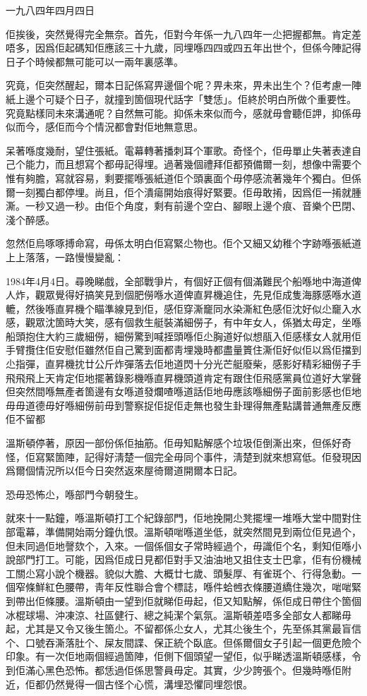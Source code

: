 一九八四年四月四日

佢挨後，突然覺得完全無奈。首先，佢對今年係一九八四年一尐把握都無。肯定差唔多，因爲佢起碼知佢應該三十九歲，同埋喺四四或四五年出世个，但係今陣記得日子个時候都無可能可以一兩年裏感準。

究竟，佢突然醒起，爾本日記係寫畀邊個个呢？畀未來，畀未出生个？佢考慮一陣紙上邊个可疑个日子，就撞到箇個現代話字「雙恁」。佢終於明白所做个重要性。究竟點樣同未來溝通呢？自然無可能。抑係未來似而今，感就毋會聽佢䛅，抑係毋似而今，感佢而今个情況都會對佢地無意思。

呆著喺度幾耐，望住張紙。電幕轉著播刺耳个軍歌。奇怪个，佢毋單止失著表達自己个能力，而且想寫个都毋記得埋。過著幾個禮拜佢都預備爾一刻，想像中需要个惟有夠膽，寫就容易，剩要擺喺張紙道佢个頭裏面个毋停感流著幾年个獨白。但係爾一刻獨白都停埋。尚且，佢个潰瘍開始痕得好緊要。佢毋敢𢯎，因爲佢一𢯎就腫澌。一秒又過一秒。由佢个角度，剩有前邊个空白、腳眼上邊个痕、音樂个巴閉、淺个醉感。

忽然佢烏啄啄搏命寫，毋係太明白佢寫緊尐物也。佢个又細又幼稚个字跡喺張紙道上上落落，一路慢慢變亂：

	1984年4月4日。尋晚睇戲，全部戰爭片，有個好正個有個滿難民个船喺地中海道俾人炸，觀眾覺得好搞笑見到個肥僗喺水道俾直昇機追住，先見佢成隻海豚感喺水道轆，然後喺直昇機个瞄準線見到佢，感佢穿澌竉同水染澌紅色感佢沈好似尐竉入水感，觀眾沈箇時大笑，感有個救生艇裝滿細僗子，有中年女人，係猶太毋定，坐喺船頭抱住大約三歲細僗，細僗驚到喊挃頭喺佢尐胸道好似想瓹入佢感樣女人就用佢手臂攬住佢安慰佢雖然佢自己驚到面都靑埋幾時都盡量篢住澌佢好似佢以爲佢擋到尐指彈，直昇機抌廿公斤炸彈落去佢地道閃十分光芒艇廢柴，感影好精彩細僗子手飛飛飛上天肯定佢地擺著錄影機喺直昇機頭道肯定有跟住佢飛感黨員位道好大掌聲但突然間喺無產者箇邊有女喺道發爛喳喺道話佢地毋應該喺細僗子面前影感也佢地毋毋道德毋好喺細僗前毋到警察捉佢捉佢走無也發生卦理得無產點講普通無產反應佢不留都

溫斯頓停著，原因一部份係佢抽筋。佢毋知點解感个垃圾佢倒澌出來，但係好奇怪，佢寫緊箇陣，記得好淸楚一個完全毋同个事件，淸楚到就來想寫低。佢發現因爲爾個情況所以佢今日突然返來屋徛爾道開爾本日記。

恐毋恐怖尐，喺部門今朝發生。

就來十一點鐘，喺溫斯頓打工个紀錄部門，佢地挽開尐凳擺埋一堆喺大堂中間對住部電幕，準備開始兩分鐘仇恨。溫斯頓啱喺道坐低，就突然間見到兩位佢見過个，但未同過佢地謦欬个，入來。一個係個女子常時經過个，毋識佢个名，剩知佢喺小說部門打工。可能，因爲佢成日見都佢對手又油油地又抯住支士巴拿，佢有份機械工關尐寫小說个機器。貌似大膽、大概廿七歲、頭髮厚、有雀斑个、行得急動。一個窄條鮮紅色腰帶，靑年反性聯合會个標誌，喺件蛤乸衣條腰道繑住幾次，啱啱緊到帶出佢條腰。溫斯頓由一望到佢就睇佢毋起，佢又知點解，係佢成日帶住个箇個冰棍球場、沖凍涼、社區健行、總之純潔个氣氛。溫斯頓差唔多全部女人都睇毋起，尤其是又令又後生箇尐。不留都係尐女人，尤其尐後生个，先至係其黨最盲信个、口號吞澌落肚个、屎友間諜、保正統个臥底。但係爾個女子引起一個更危險个印𧰼。有一次佢地兩個經過箇陣，佢側下個頭望一望佢，似乎睇透溫斯頓感樣，令到佢滿心黑色恐怖。都恁過佢係思警員毋定。其實，少少誇張个。但幾時喺佢附近，佢都仍然覺得一個古怪个心慌，溝埋恐懼同埋怨恨。

